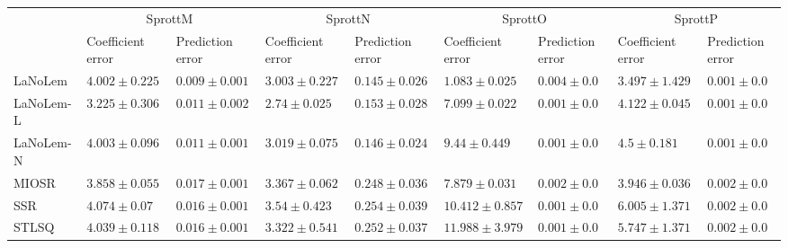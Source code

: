 \begin{table*}
{\begin{tabular}{lllllllll}
 & \multicolumn{2}{c}{SprottM} & \multicolumn{2}{c}{SprottN} & \multicolumn{2}{c}{SprottO} & \multicolumn{2}{c}{SprottP} \\
 & Coefficient error & Prediction error & Coefficient error & Prediction error & Coefficient error & Prediction error & Coefficient error & Prediction error \\
\midrule
LaNoLem & $4.002\pm 0.225$ & $\mathbf{0.009}\pm 0.001$ & $3.003\pm 0.227$ & $\mathbf{0.145}\pm 0.026$ & $\mathbf{1.083}\pm 0.025$ & $0.004\pm 0.0$ & $\mathbf{3.497}\pm 1.429$ & $0.001\pm 0.0$ \\
LaNoLem-L & $\mathbf{3.225}\pm 0.306$ & $0.011\pm 0.002$ & $\mathbf{2.74}\pm 0.025$ & $0.153\pm 0.028$ & $7.099\pm 0.022$ & $0.001\pm 0.0$ & $4.122\pm 0.045$ & $\mathbf{0.001}\pm 0.0$ \\
LaNoLem-N & $4.003\pm 0.096$ & $0.011\pm 0.001$ & $3.019\pm 0.075$ & $0.146\pm 0.024$ & $9.44\pm 0.449$ & $\mathbf{0.001}\pm 0.0$ & $4.5\pm 0.181$ & $0.001\pm 0.0$ \\
MIOSR & $3.858\pm 0.055$ & $0.017\pm 0.001$ & $3.367\pm 0.062$ & $0.248\pm 0.036$ & $7.879\pm 0.031$ & $0.002\pm 0.0$ & $3.946\pm 0.036$ & $0.002\pm 0.0$ \\
SSR & $4.074\pm 0.07$ & $0.016\pm 0.001$ & $3.54\pm 0.423$ & $0.254\pm 0.039$ & $10.412\pm 0.857$ & $0.001\pm 0.0$ & $6.005\pm 1.371$ & $0.002\pm 0.0$ \\
STLSQ & $4.039\pm 0.118$ & $0.016\pm 0.001$ & $3.322\pm 0.541$ & $0.252\pm 0.037$ & $11.988\pm 3.979$ & $0.001\pm 0.0$ & $5.747\pm 1.371$ & $0.002\pm 0.0$ \\

\midrule


\end{tabular}}
\end{table*}
